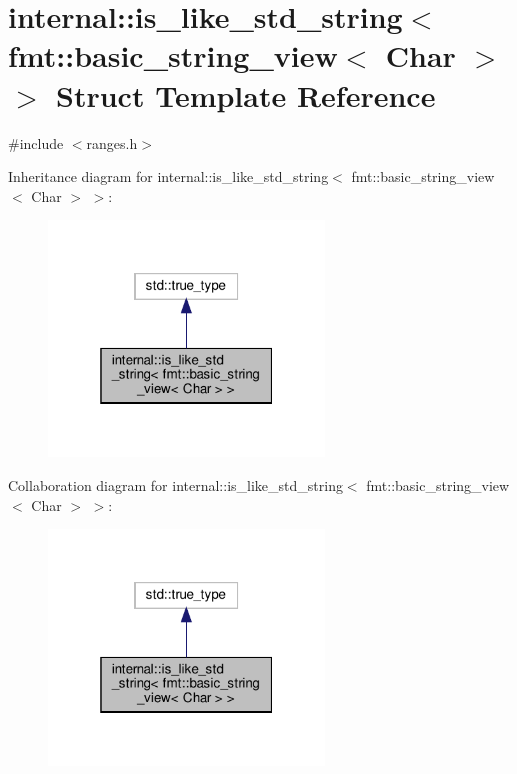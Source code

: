 \hypertarget{structinternal_1_1is__like__std__string_3_01fmt_1_1basic__string__view_3_01_char_01_4_01_4}{}\section{internal\+:\+:is\+\_\+like\+\_\+std\+\_\+string$<$ fmt\+:\+:basic\+\_\+string\+\_\+view$<$ Char $>$ $>$ Struct Template Reference}
\label{structinternal_1_1is__like__std__string_3_01fmt_1_1basic__string__view_3_01_char_01_4_01_4}


{\ttfamily \#include $<$ranges.\+h$>$}



Inheritance diagram for internal\+:\+:is\+\_\+like\+\_\+std\+\_\+string$<$ fmt\+:\+:basic\+\_\+string\+\_\+view$<$ Char $>$ $>$\+:
\nopagebreak
\begin{figure}[H]
\begin{center}
\leavevmode
\includegraphics[width=208pt]{structinternal_1_1is__like__std__string_3_01fmt_1_1basic__string__view_3_01_char_01_4_01_4__inherit__graph}
\end{center}
\end{figure}


Collaboration diagram for internal\+:\+:is\+\_\+like\+\_\+std\+\_\+string$<$ fmt\+:\+:basic\+\_\+string\+\_\+view$<$ Char $>$ $>$\+:
\nopagebreak
\begin{figure}[H]
\begin{center}
\leavevmode
\includegraphics[width=208pt]{structinternal_1_1is__like__std__string_3_01fmt_1_1basic__string__view_3_01_char_01_4_01_4__coll__graph}
\end{center}
\end{figure}


